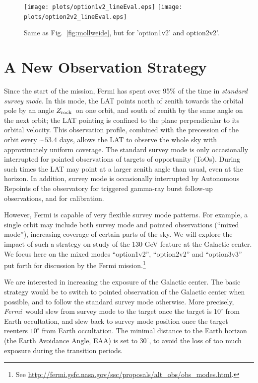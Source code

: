 \documentclass[aps,prd,superscriptaddress,showpacs,nofootinbib,fixlfloat, 12pt]{revtex4-1}
\newcommand{\Fermi}{{\slshape Fermi}}
\newcommand{\zrock}{$Z_{\rm rock}$}
\begin{document}
\begin{figure}[t]
  \begin{center}
    \texttt{[image: plots/option1v2\_lineEval.eps]}
    \texttt{[image: plots/option2v2\_lineEval.eps]}
    \vspace{-0.5cm}
  \end{center}
  \caption{Same as Fig.~\ref{fig:mollweide}, but for 'option1v2' and
  option2v2'.}
  \label{fig:mollweide2}
\end{figure}

\section{A New Observation Strategy}
Since the start of the mission, Fermi has spent over 95\% of the time in
\emph{standard survey mode}.
In this mode, the LAT points north of zenith towards the orbital pole by an
angle \zrock\ on one orbit, and south of zenith by the same angle on the next
orbit; the LAT pointing is confined to the plane perpendicular to its orbital
velocity. 
This observation profile, combined with the precession of the orbit every
$\sim53.4$ days, allows the LAT to observe the whole sky with approximately
uniform coverage. The standard survey mode is only occasionally interrupted
for pointed observations of targets of opportunity (ToOs). During such times
the LAT may point at a larger zenith angle than usual, even at the horizon.  In
addition, survey mode is occasionally interrupted by Autonomous Repoints of
the observatory for triggered gamma-ray burst follow-up observations, and for
calibration.

However, Fermi is capable of very flexible survey mode patterns. For example,
a single orbit may include both survey mode and pointed observations (``mixed
mode''), increasing coverage of certain parts of the sky. We will explore the
impact of such a strategy on study of the 130 GeV feature at the Galactic
center.  We focus here on the mixed modes ``option1v2'', ``option2v2'' and
``option3v3'' put forth for discussion by the Fermi mission.\footnote{See
\url{http://fermi.gsfc.nasa.gov/ssc/proposals/alt_obs/obs_modes.html}.}

We are interested in increasing the exposure of the Galactic center.  The
basic strategy would be to switch to pointed observation of the Galactic
center when possible, and to follow the standard survey mode otherwise. More
precisely, \Fermi\ would slew from survey mode to the target once the target
is $10^\circ$ from Earth occultation, and slew back to survey mode position
once the target reenters $10^\circ$ from Earth occultation.  The minimal
distance to the Earth horizon (the Earth Avoidance Angle, EAA) is set to
$30^\circ$, to avoid the loss of too much exposure during the transition
periods. 
\end{document}
